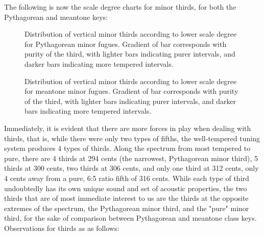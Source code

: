 The following is now the scale degree charts for minor thirds, for both
the Pythagorean and meantone keys:




\begin{figure}[H]
\vspace{1.5em}
    \centering
    \caption[Distribution of vertical minor thirds, according to lower scale degree for Pythagorean minor fugues. ]{Distribution of vertical minor thirds according to lower scale degree for Pythagorean minor fugues. Gradient of bar corresponds with purity of the third, with lighter bars indicating purer intervals, and darker bars indicating more tempered intervals.}
\end{figure}

\begin{figure}[H]
\vspace{1.5em}
    \centering
    \caption[Distribution of vertical minor thirds, according to lower scale degree for meantone minor fugues. ]{Distribution of vertical minor thirds according to lower scale degree for meantone minor fugues. Gradient of bar corresponds with purity of the third, with lighter bars indicating purer intervals, and darker bars indicating more tempered intervals.}
\end{figure}    Immediately, it is evident that there are more forces in play when
dealing with thirds, that is, while there were only two types of fifths,
the well-tempered tuning system produces 4 types of thirds. Along the
spectrum from most tempered to pure, there are 4 thirds at 294 cents
(the narrowest, Pythagorean minor third), 5 thirds at 300 cents, two
thirds at 306 cents, and only one third at 312 cents, only 4 cents away
from a pure, 6:5 ratio fifth of 316 cents. While each type of third
undoubtedly has its own unique sound and set of acoustic properties, the
two thirds that are of most immediate interest to us are the thirds at
the opposite extremes of the spectrum, the Pythagorean minor third, and
the "pure" minor third, for the sake of comparison between Pythagorean
and meantone class keys. Observations for thirds as as follows:

